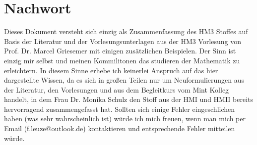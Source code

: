 \section{Nachwort}
Dieses Dokument versteht sich einzig als Zusammenfassung des HM3 Stoffes auf Basis der Literatur und der Vorlesungsunterlagen aus der HM3 Vorlesung von Prof. Dr. Marcel Griesemer mit einigen zusätzlichen Beispielen. Der Sinn ist einzig mir selbst und meinen Kommilitonen das studieren der Mathematik zu erleichtern. In diesem Sinne erhebe ich keinerlei Anspruch auf das hier dargestellte Wissen, da es sich in großen Teilen nur um Neuformulierungen aus der Literatur, den Vorlesungen und aus dem Begleitkurs vom Mint Kolleg handelt, in dem Frau Dr. Monika Schulz den Stoff aus der HMI und HMII bereits hervorragend zusammengefasst hat. Sollten sich einige Fehler eingeschlichen haben (was sehr wahrscheinlich ist) würde ich mich freuen, wenn man mich per Email (f.leuze@outlook.de) kontaktieren und entsprechende Fehler mitteilen würde.